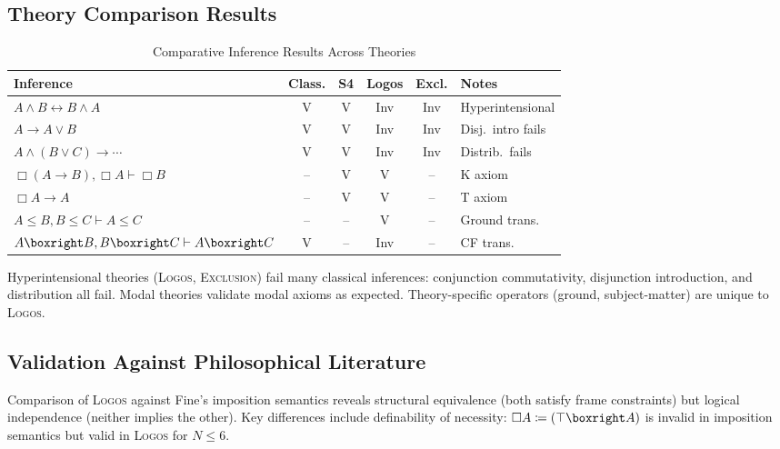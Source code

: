 \documentclass[pdflatex,sn-mathphys-num]{sn-jnl}
\newcommand{\nec}{\Box}                     %
\newcommand{\imp}{\to}                      %
\newcommand{\ground}{\leq}                  %
\newcommand{\define}{\coloneqq}             %
\newcommand{\theorylogos}{\textsc{Logos}}
\newcommand{\theoryexclusion}{\textsc{Exclusion}}
\theoremstyle{thmstyleone}
\theoremstyle{thmstyletwo}
\theoremstyle{thmstylethree}
\begin{document}
\subsection{Theory Comparison Results}\label{sec:theory-comparison-results}

\begin{table}[htbp]
\centering
\caption{Comparative Inference Results Across Theories}
\label{tab:inference-comparison}
\small
\begin{tabular}{@{}p{3.5cm}ccccp{2.5cm}@{}}
\toprule
\textbf{Inference} & \textbf{Class.} & \textbf{S4} & \textbf{Logos} & \textbf{Excl.} & \textbf{Notes} \\
\midrule
$A \land B \leftrightarrow B \land A$ & V & V & Inv & Inv & Hyperintensional \\
$A \imp A \lor B$ & V & V & Inv & Inv & Disj.\ intro fails \\
$A \land (B \lor C) \imp \cdots$ & V & V & Inv & Inv & Distrib.\ fails \\
$\nec(A \imp B), \nec A \vdash \nec B$ & -- & V & V & -- & K axiom \\
$\nec A \imp A$ & -- & V & V & -- & T axiom \\
$A \ground B, B \ground C \vdash A \ground C$ & -- & -- & V & -- & Ground trans. \\
$A \boxright B, B \boxright C \vdash A \boxright C$ & V & -- & Inv & -- & CF trans. \\
\bottomrule
\end{tabular}
\end{table}

Hyperintensional theories (\theorylogos{}, \theoryexclusion{}) fail many classical inferences: conjunction commutativity, disjunction introduction, and distribution all fail.
Modal theories validate modal axioms as expected.
Theory-specific operators (ground, subject-matter) are unique to \theorylogos{}.

\subsection{Validation Against Philosophical Literature}\label{sec:literature-validation}

Comparison of \theorylogos{} against Fine's imposition semantics reveals structural equivalence (both satisfy frame constraints) but logical independence (neither implies the other).
Key differences include definability of necessity: $\nec A \define (\top \boxright A)$ is invalid in imposition semantics but valid in \theorylogos{} for $N \leq 6$.
\end{document}
